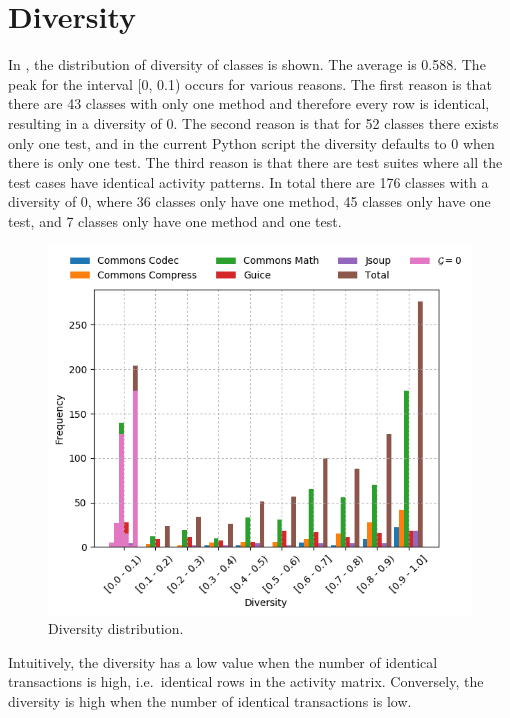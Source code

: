 \documentclass[twoside,a4paper,11pt]{memoir}
\begin{document}

\section{Diversity}
In , the distribution of diversity of classes is shown.
The average is 0.588.
The peak for the interval [0, 0.1) occurs for various reasons.
The first reason is that there are 43 classes with only one method and therefore every row is identical, resulting in a diversity of 0.
The second reason is that for 52 classes there exists only one test, and in the current Python script the diversity defaults to 0 when there is only one test.
The third reason is that there are test suites where all the test cases have identical activity patterns.
In total there are 176 classes with a diversity of 0, where 36 classes only have one method, 45 classes only have one test, and 7 classes only have one method and one test.

\begin{figure}
    \centering
    \includegraphics[width=\linewidth]{figures/grouped_barchart_diversity}
    \caption{Diversity distribution.}%
    \label{fig:histogram_diversity}
\end{figure}

Intuitively, the diversity has a low value when the number of identical transactions is high, i.e.\ identical rows in the activity matrix.
Conversely, the diversity is high when the number of identical transactions is low.
\end{document}
